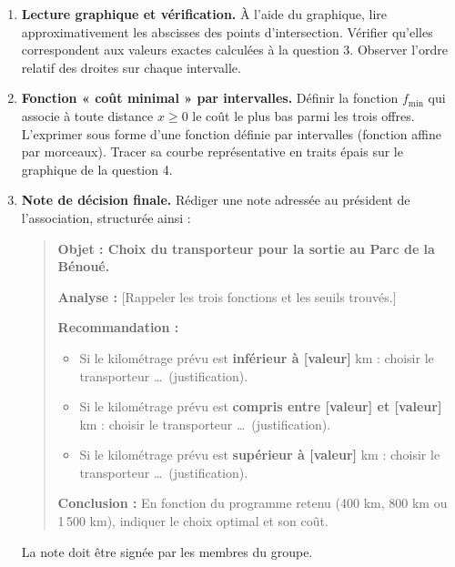\documentclass[11pt]{article}
\begin{document}
\begin{enumerate}
    \item \textbf{Lecture graphique et vérification.}
    À l'aide du graphique, lire approximativement les abscisses des points d'intersection. Vérifier qu'elles correspondent aux valeurs exactes calculées à la question 3. Observer l'ordre relatif des droites sur chaque intervalle.

    \item \textbf{Fonction « coût minimal » par intervalles.}
    Définir la fonction $f_{\min}$ qui associe à toute distance $x \ge 0$ le coût le plus bas parmi les trois offres. L'exprimer sous forme d'une fonction définie par intervalles (fonction affine par morceaux). Tracer sa courbe représentative en traits épais sur le graphique de la question 4.

    \item \textbf{Note de décision finale.}
    Rédiger une note adressée au président de l'association, structurée ainsi :
    \begin{quote}
        \textbf{Objet : Choix du transporteur pour la sortie au Parc de la Bénoué.}
        
        \textbf{Analyse :} [Rappeler les trois fonctions et les seuils trouvés.]
        
        \textbf{Recommandation :}
        \begin{itemize}
            \item Si le kilométrage prévu est \textbf{inférieur à [valeur]} km : choisir le transporteur \dots\ (justification).
            \item Si le kilométrage prévu est \textbf{compris entre [valeur] et [valeur]} km : choisir le transporteur \dots\ (justification).
            \item Si le kilométrage prévu est \textbf{supérieur à [valeur]} km : choisir le transporteur \dots\ (justification).
        \end{itemize}
        \textbf{Conclusion :} En fonction du programme retenu (400 km, 800 km ou 1\,500 km), indiquer le choix optimal et son coût.
    \end{quote}
    La note doit être signée par les membres du groupe.
\end{enumerate}
\end{document}

